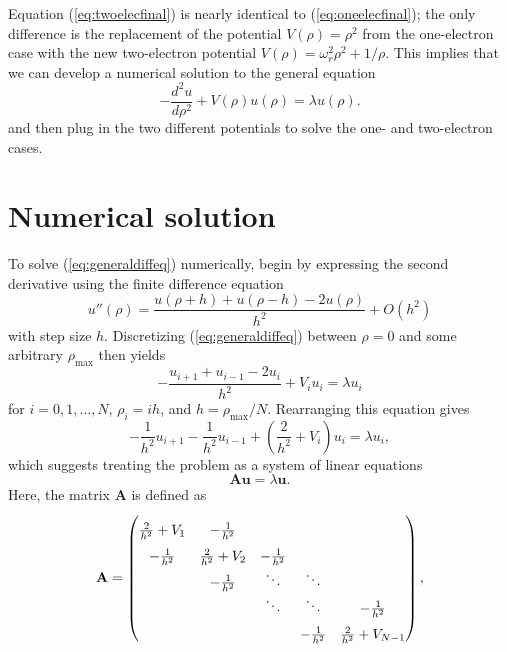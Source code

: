 \documentclass[aps,prc,reprint,nobalancelastpage]{revtex4-1}
\begin{document}
        Equation (\ref{eq:twoelecfinal}) is nearly identical to (\ref{eq:oneelecfinal}); the only difference is the replacement of the potential $V(\rho) = \rho^2$ from the one-electron case with the new two-electron potential $V(\rho) = \omega_r^2 \rho^2 + 1/\rho$. This implies that we can develop a numerical solution to the general equation
        \begin{equation}
            -\frac{d^2 u}{d\rho^2} + V(\rho) u(\rho) = \lambda u(\rho). \label{eq:generaldiffeq}
        \end{equation}
        and then plug in the two different potentials to solve the one- and two-electron cases.


\section{Numerical solution}
\label{sec:numsoln}
    To solve (\ref{eq:generaldiffeq}) numerically, begin by expressing the second derivative using the finite difference equation
    \begin{equation}
        u''(\rho) = \frac{u(\rho + h) + u(\rho - h) - 2u(\rho)}{h^2} + O(h^2)  \label{eq:findiff}
    \end{equation}
    with step size $h$. Discretizing (\ref{eq:generaldiffeq}) between $\rho = 0$ and some arbitrary $\rho_\text{max}$ then yields
    \begin{equation}
        -\frac{u_{i+1} + u_{i-1} - 2u_i}{h^2} + V_i u_i = \lambda u_i
    \end{equation}
    for $i=0,1,\dots,N$, $\rho_i = ih$, and $h = \rho_\text{max} / N$. Rearranging this equation gives
    \begin{equation}
        - \frac{1}{h^2} u_{i+1} - \frac{1}{h^2} u_{i-1} + \left(\frac{2}{h^2} + V_i\right)u_i = \lambda u_i,
    \end{equation}
    which suggests treating the problem as a system of linear equations
    \begin{equation}
        \mathbf{A}\mathbf{u} = \lambda \mathbf{u}.
    \end{equation}
    Here, the matrix $\mathbf{A}$ is defined as
    \begin{equation}
        \mathbf{A} =
        \begin{pmatrix}
            \frac{2}{h^2}+V_1 & -\frac{1}{h^2}    &                &        & \vphantom{\ddots} \\
            -\frac{1}{h^2}    & \frac{2}{h^2}+V_2 & -\frac{1}{h^2} &        & \vphantom{\ddots} \\
                              & -\frac{1}{h^2}    & \ddots         & \ddots &                   \\
                              &                   & \ddots         & \ddots & -\frac{1}{h^2}    \\
            \vphantom{\ddots} &                   &             & -\frac{1}{h^2} & \frac{2}{h^2}+V_{N-1} \\
        \end{pmatrix},
    \end{equation}
\end{document}
